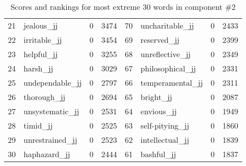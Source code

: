 \begin{table}[tbp]
\begin{tabular}{| rlr@{.}l | rlr@{.}l |}
    21 & jealous\_jj & 0 & 3474    &    70 & uncharitable\_jj & 0 & 2433 \\
    22 & irritable\_jj & 0 & 3454    &    69 & reserved\_jj & 0 & 2399 \\
    23 & helpful\_jj & 0 & 3255    &    68 & unreflective\_jj & 0 & 2349 \\
    24 & harsh\_jj & 0 & 3029    &    67 & philosophical\_jj & 0 & 2331 \\
    25 & undependable\_jj & 0 & 2797    &    66 & temperamental\_jj & 0 & 2311 \\
    26 & thorough\_jj & 0 & 2694    &    65 & bright\_jj & 0 & 2087 \\
    27 & unsystematic\_jj & 0 & 2531    &    64 & envious\_jj & 0 & 1949 \\
    28 & timid\_jj & 0 & 2525    &    63 & self-pitying\_jj & 0 & 1860 \\
    29 & unrestrained\_jj & 0 & 2523    &    62 & intellectual\_jj & 0 & 1839 \\
    30 & haphazard\_jj & 0 & 2444    &    61 & bashful\_jj & 0 & 1837 \\
    \hline
    \end{tabular}
    \caption{Scores and rankings for most extreme 30 words in component \#2} 
\end{table}
\clearpage
